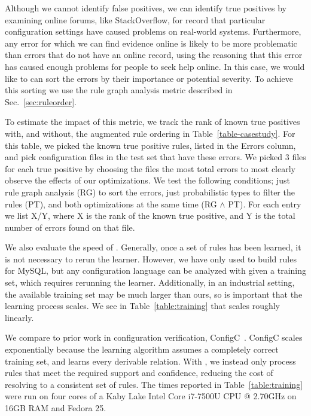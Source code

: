 Although we cannot identify false positives, we can identify true positives by examining online forums, like StackOverflow, for record that
particular configuration settings have caused problems on real-world systems.
Furthermore, any error for which we can find evidence online is likely to be more problematic than errors that do not have an online record, 
  using the reasoning that this error has caused enough problems for people to seek help online.
In this case, we would like \app to can sort the errors by their importance or potential severity.
To achieve this sorting we use the rule graph analysis metric described in Sec.~\ref{sec:ruleorder}.

To estimate the impact of this metric, we track the rank of known true positives with, and without, the augmented rule ordering in Table~\ref{table-casestudy}.
For this table, we picked the known true positive rules, listed in the Errors column, and pick configuration files in the test set that have these errors.
We picked 3 files for each true positive by choosing the files the most total errors to most clearly observe the effects of our optimizations.
We test the following conditions; just rule graph analysis (RG) to sort the errors, just probabilistic types to filter the rules (PT), and both optimizations at the same time (RG $\land$ PT).
For each entry we list X/Y, where X is the rank of the known true positive, and Y is the total number of errors found on that file.



We also evaluate the speed of \app.
Generally, once a set of rules has been learned, it is not necessary to rerun the learner.
However, we have only used \app to build rules for MySQL, but any configuration language can be analyzed with \app given a training set, which requires rerunning the learner.
Additionally, in an industrial setting, the available training set may be much larger than ours, so is important that the learning process scales.
We see in Table~\ref{table:training} that \app scales roughly linearly.

We compare \app to prior work in configuration verification, ConfigC~\cite{santolucitoCAV}.
ConfigC scales exponentially because the learning algorithm assumes a completely correct training set, and learns every derivable relation.
With \app, we instead only process rules that meet the required support and confidence, reducing the cost of resolving to a consistent set of rules. 
The times reported in Table~\ref{table:training} were run on four cores of a Kaby Lake Intel Core i7-7500U CPU @ 2.70GHz on 16GB RAM and Fedora 25.

